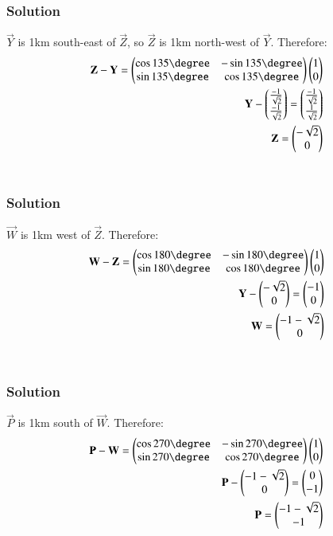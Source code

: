 \documentclass{beamer}
\begin{document}
\begin{frame}[fragile]
    \frametitle{Solution}
$\vec{Y}$ is 1km south-east of $\vec{Z}$, so $\vec{Z}$ is 1km north-west of $\vec{Y}$. Therefore:\begin{align}
\vec{Z}-\vec{Y} = \myvec{\cos135\degree & -\sin135\degree \\ \sin135\degree & \cos135\degree}\myvec{1\\0}\\
\vec{Y}-\myvec{\frac{-1}{\sqrt{2}}\\\frac{-1}{\sqrt{2}}} = \myvec{\frac{-1}{\sqrt{2}}\\\frac{1}{\sqrt{2}}}\\
\vec{Z}=\myvec{-\sqrt{2}\\0}
\end{align}\\
\end{frame}

\begin{frame}[fragile]
    \frametitle{Solution}
$\vec{W}$ is 1km west of $\vec{Z}$. Therefore:\begin{align}
\vec{W}-\vec{Z} = \myvec{\cos180\degree & -\sin180\degree \\ \sin180\degree & \cos180\degree}\myvec{1\\0}\\
\vec{Y}-\myvec{-\sqrt{2}\\0} = \myvec{-1\\0}\\
\vec{W}=\myvec{-1-\sqrt{2}\\0}
\end{align}\\
\end{frame}

\begin{frame}[fragile]
    \frametitle{Solution}
$\vec{P}$ is 1km south of $\vec{W}$. Therefore:\begin{align}
\vec{P}-\vec{W} = \myvec{\cos270\degree & -\sin270\degree \\ \sin270\degree & \cos270\degree}\myvec{1\\0}\\
\vec{P}-\myvec{-1-\sqrt{2}\\0} = \myvec{0\\-1}\\
\vec{P}=\myvec{-1-\sqrt{2}\\-1}
\end{align}\\
\end{frame}
\end{document}
